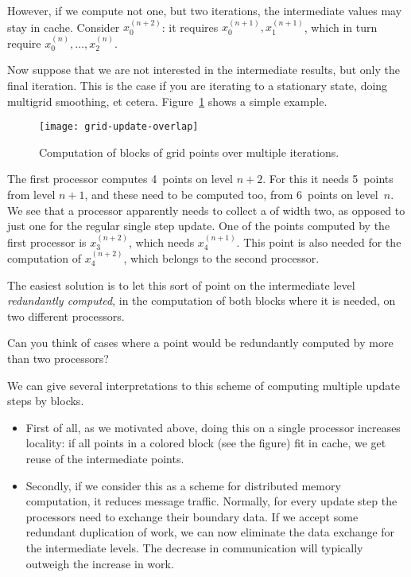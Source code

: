 However,
if we compute not one, but two iterations, the intermediate values
may stay in cache.
Consider $x^{(n+2)}_0$: it requires $x^{(n+1)}_0,x^{(n+1)}_1$,
which in turn require $x^{(n)}_0,\ldots,x^{(n)}_2$.

Now suppose that we are not interested in the intermediate results, but
only the final iteration.
This is the case if you are iterating to a stationary state,
doing multigrid smoothing, et cetera.
Figure~\ref{fig:grid-update-overlap} shows
a simple example.
\begin{figure}[ht]
\texttt{[image: grid-update-overlap]}
\caption{Computation of blocks of grid points over multiple iterations.}
\label{fig:grid-update-overlap}
\end{figure}
The first processor computes 4~points on level $n+2$. For this it needs 5~points
from level $n+1$, and these need to be computed too, from 6~points on level~$n$.
We see that a processor apparently needs to collect a 
of width two, as opposed to just one for the regular single step update.
One of the points computed by the first processor is $x^{(n+2)}_3$,
which needs $x^{(n+1)}_4$. This point is also needed for the computation
of $x^{(n+2)}_4$, which belongs to the second processor.

The easiest solution is to let this sort of point on the intermediate
level \emph{redundantly computed}, in 
the computation of both blocks where it is needed, on two different processors.

\begin{exercise}
  Can you think of cases where a point would be redundantly computed by
  more than two processors?
\end{exercise}

We can give several interpretations to this scheme of computing multiple
update steps by blocks. 
\begin{itemize}
\item First of all, as we motivated above, doing this 
on a single processor increases locality: if all points in a colored block
(see the figure) fit in cache, we get reuse of the intermediate points.
\item Secondly, if we consider this as a scheme for distributed memory computation,
it reduces message traffic. Normally, for every update step the processors
need to exchange their boundary data. If we accept some redundant duplication
of work, we can now eliminate the data exchange for the intermediate levels.
The decrease in communication will typically outweigh the increase in work.
\end{itemize}

